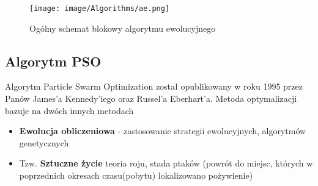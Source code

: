 \documentclass[eng, pl, oneside, openright, final, openbib]{mgr}\DeclareUnicodeCharacter{0301}{\'{e}}
\begin{document}
\begin{figure}[h]
\centering
\label{fig:ra}
\texttt{[image: image/Algorithms/ae.png]}
\caption{Ogólny schemat blokowy algorytmu ewolucyjnego}
\end{figure}

\newpage
\subsection{Algorytm PSO}
Algorytm Particle Swarm Optimization został opublikowany w roku 1995 przez Panów James'a Kennedy'iego oraz Russel'a Eberhart'a. Metoda optymalizacji bazuje na dwóch innych metodach
\begin{itemize}
\item \textbf{Ewolucja obliczeniowa} - zastosowanie strategii ewolucyjnych, algorytmów genetycznych
\item Tzw. \textbf{Sztuczne życie} teoria roju, stada ptaków (powrót do miejsc, których w poprzednich okresach czasu(pobytu) lokalizowano pożywienie)
\end{itemize}
\end{document}
